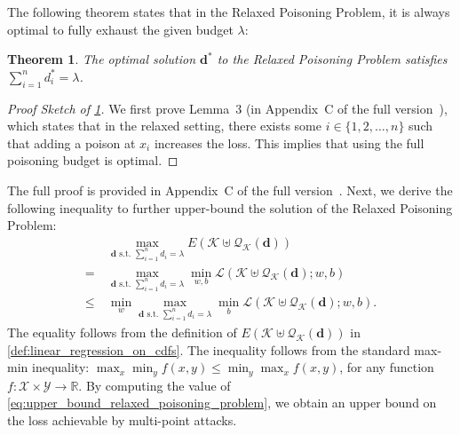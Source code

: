 \documentclass[acmsmall]{acmart}
\newtheorem{theorem}{Theorem}
\begin{document}
The following theorem states that in the Relaxed Poisoning Problem, it is always optimal to fully exhaust the given budget $\lambda$:
\begin{theorem_box}
\begin{theorem}
\label{thm:d_saturation}
The optimal solution $\bm{d}^\ast$ to the Relaxed Poisoning Problem satisfies $\sum_{i=1}^{n} d_i^\ast = \lambda$.
\end{theorem}
\end{theorem_box}
\begin{proof}[Proof Sketch of \cref{thm:d_saturation}]
    We first prove Lemma~3 (in Appendix~C of the full version~\cite{sato2026mathematical_arxiv}), which states that in the relaxed setting, there exists some $i\in\{1,2,\dots,n\}$ such that adding a poison at $x_i$ increases the loss.
    This implies that using the full poisoning budget is optimal.
\end{proof}
The full proof is provided in Appendix~C of the full version~\cite{sato2026mathematical_arxiv}.
Next, we derive the following inequality to further upper-bound the solution of the Relaxed Poisoning Problem:
\begin{align}
&~ \max_{\bm{d} \text{ s.t. } \sum_{i=1}^{n} d_i = \lambda} E(\mathcal{K} \uplus \mathcal{Q}_\mathcal{K}(\bm{d})) \\
=&~ \max_{\bm{d} \text{ s.t. } \sum_{i=1}^{n} d_i = \lambda} \min_{w,b} \mathcal{L}(\mathcal{K} \uplus \mathcal{Q}_\mathcal{K}(\bm{d}); w, b) \\
\label{eq:upper_bound_relaxed_poisoning_problem}
\leq&~ \min_{w} \max_{\bm{d} \text{ s.t. } \sum_{i=1}^{n} d_i = \lambda} \min_{b} \mathcal{L}(\mathcal{K} \uplus \mathcal{Q}_\mathcal{K}(\bm{d}); w, b).
\end{align}
The equality follows from the definition of $E(\mathcal{K} \uplus \mathcal{Q}_\mathcal{K}(\bm{d}))$ in \cref{def:linear_regression_on_cdfs}.
The inequality follows from the standard max-min inequality: $\max_{x} \min_{y} f(x, y) \leq \min_{y} \max_{x} f(x, y)$, for any function $f: \mathcal{X} \times \mathcal{Y} \to \mathbb{R}$. 
By computing the value of \cref{eq:upper_bound_relaxed_poisoning_problem}, we obtain an upper bound on the loss achievable by multi-point attacks.
\end{document}
